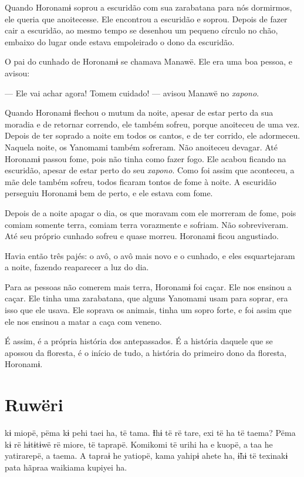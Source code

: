 Quando Horonamɨ soprou a escuridão com sua zarabatana para nós
dormirmos, ele queria que anoitecesse. Ele encontrou a escuridão e
soprou. Depois de fazer cair a escuridão, ao mesmo tempo se desenhou um
pequeno círculo no chão, embaixo do lugar onde estava empoleirado o dono
da escuridão.

O pai do cunhado de Horonamɨ se chamava Manawë. Ele era uma boa pessoa,
e avisou: 

 --- Ele vai achar agora! Tomem cuidado! --- avisou Manawë no \textit{xapono}. 

Quando Horonamɨ flechou o mutum da noite, apesar de estar perto da sua
 moradia e de retornar correndo, ele também sofreu, porque anoiteceu
 de uma vez. Depois de ter soprado a noite em todos os cantos, e de ter
 corrido, ele adormeceu. Naquela noite, os Yanomami também sofreram. Não
 anoiteceu devagar. Até Horonamɨ passou fome, pois não tinha como fazer
 fogo. Ele acabou ficando na escuridão, apesar de estar perto do seu
 \textit{xapono}. Como foi assim que aconteceu, a mãe dele também sofreu, todos
 ficaram tontos de fome à noite. A escuridão perseguiu Horonamɨ bem de
 perto, e ele estava com fome. 

Depois de a noite apagar o dia, os que moravam com ele morreram de
fome, pois comiam somente terra, comiam terra vorazmente e sofriam. Não
sobreviveram. Até seu próprio cunhado sofreu e quase morreu. Horonamɨ
ficou angustiado.

Havia então três pajés: o avô, o avô mais novo e o cunhado, e eles
esquartejaram a noite, fazendo reaparecer a luz do dia. 

Para as pessoas não comerem mais terra, Horonamɨ foi caçar. Ele nos
ensinou a caçar. Ele tinha uma zarabatana, que alguns Yanomami usam para
soprar, era isso que ele usava. Ele soprava os animais, tinha um sopro
forte, e foi assim que ele nos ensinou a matar a caça com veneno. 

 É assim, é a própria história dos antepassados. É a história
daquele que se apossou da floresta, é o início de tudo, a história do
primeiro dono da floresta, Horonamɨ.

\chapter{Ruwëri}

 kɨ miopë, pëma kɨ pehi taei ha, të tama. Ɨhɨ të rë tare, exi të ha
të taema? Pëma kɨ rë hɨtɨtɨwë rë miore, të taprapë. Komikomi të urihi ha
e kuopë, a taa he yatirarepë, a taema. A tapraɨ he yatiopë, kama yahipɨ
ahete ha, ɨ̃hɨ të texinakɨ pata hãpraa waikiama kupiyei ha. 

